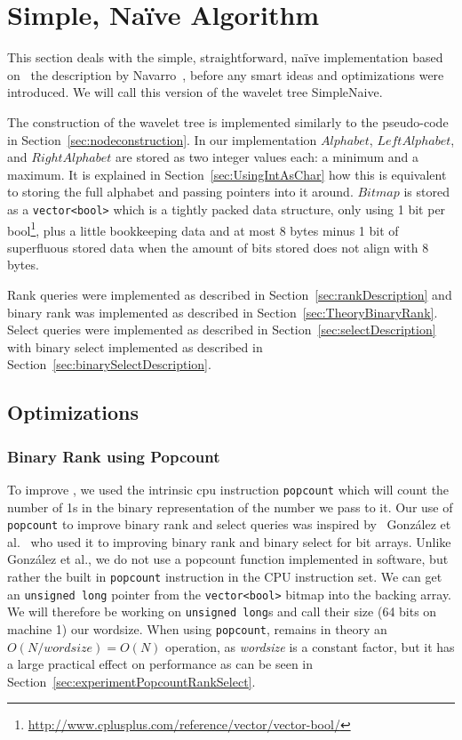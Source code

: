 \section{Simple, Naïve Algorithm}
This section deals with the simple, straightforward, naïve implementation based on ~the description by Navarro~, before any smart ideas and optimizations were introduced.
We will call this version of the wavelet tree SimpleNaive.

The construction of the wavelet tree is implemented similarly to the pseudo-code in Section~\ref{sec:nodeconstruction}.
In our implementation $Alphabet$, $LeftAlphabet$, and $RightAlphabet$ are stored as two integer values each: a minimum and a maximum.
It is explained in Section~\ref{sec:UsingIntAsChar} how this is equivalent to storing the full alphabet and passing pointers into it around.
$Bitmap$ is stored as a \texttt{vector<bool>} which is a tightly packed data structure, only using 1 bit per bool\footnote{\url{http://www.cplusplus.com/reference/vector/vector-bool/}}, plus a little bookkeeping data and at most 8 bytes minus 1 bit of superfluous stored data when the amount of bits stored does not align with 8 bytes.

Rank queries were implemented as described in Section~\ref{sec:rankDescription} and
binary rank was implemented as described in Section~\ref{sec:TheoryBinaryRank}.
Select queries were implemented as described in Section~\ref{sec:selectDescription} with binary select implemented as described in Section~\ref{sec:binarySelectDescription}.

\subsection{Optimizations}
\label{sec:simpleoptimizations}
\subsubsection{Binary Rank using Popcount}
\label{sec:popcountBinaryRank}
 
To improve , we used the intrinsic cpu instruction \texttt{popcount} which will count the number of 1s in the binary representation of the number we pass to it.
Our use of \texttt{popcount} to improve binary rank and select queries was inspired by~ González et al.~ who used it to improving binary rank and binary select for bit arrays.
Unlike González et al., we do not use a popcount function implemented in software, but rather the built in \texttt{popcount} instruction in the CPU instruction set.
We can get an \texttt{unsigned long} pointer from the \texttt{vector<bool>} bitmap into the backing array. We will therefore be working on \texttt{unsigned long}s and call their size (64 bits on machine 1) our wordsize.
When using \texttt{popcount},  remains in theory an $O(N/wordsize) = O(N)$ operation, as \textit{wordsize} is a constant factor, but it has a large practical effect on performance as can be seen in Section~\ref{sec:experimentPopcountRankSelect}.

